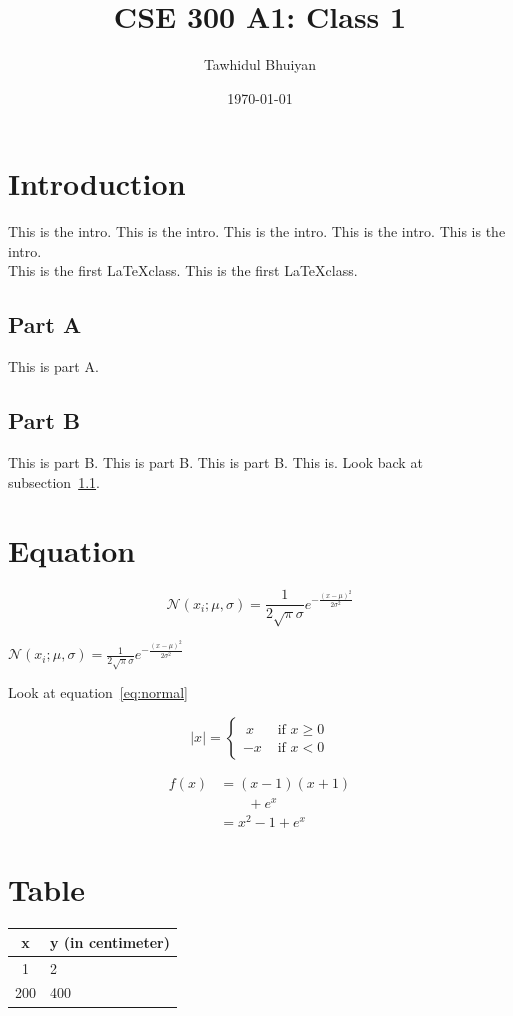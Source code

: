 \documentclass{article}
\title{CSE 300 A1: Class 1}
\author{Tawhidul Bhuiyan}
\date{\today}
\begin{document}
\maketitle

\section{Introduction}
This is the intro. 
This is the intro.
This is the intro.
This is the intro.
This is the intro. \\
This is the first \LaTeX class. 
This is the first \LaTeX class.

\subsection{Part A} \label{subsec:a}
This is part A.

\subsection{Part B}
This is part B. This is part B. This is part B. This is. Look back at subsection~\ref{subsec:a}.

\section{Equation}
\begin{equation} \label{eq:normal}
    \mathcal{N}(x_i;\mu,\sigma)=\frac{1}{2\sqrt{\pi}\sigma}e^{-\frac{(x-\mu)^{2}}{2\sigma^2}}
\end{equation}

$\mathcal{N}(x_i;\mu,\sigma)=\frac{1}{2\sqrt{\pi}\sigma}e^{-\frac{(x-\mu)^{2}}{2\sigma^2}}$

Look at equation~\eqref{eq:normal}

\begin{equation}
    |x| = 
    \begin{cases}
    \ x  & \text{ if } x \geq 0\\
    -x & \text{ if } x < 0
    \end{cases}
\end{equation}

\begin{align}
    f(x) 
    & = (x-1)(x+1) \nonumber \\ 
    & \qquad + e^x \nonumber \\
    & = x^2-1 + e^x
\end{align}

\section{Table}
\begin{tabular}{|c p{2cm}|}
    \hline
    x & y (in centimeter) \\
    \hline
    1 & 2 \\
    200 & 400 \\
    \hline
\end{tabular}
\end{document}
